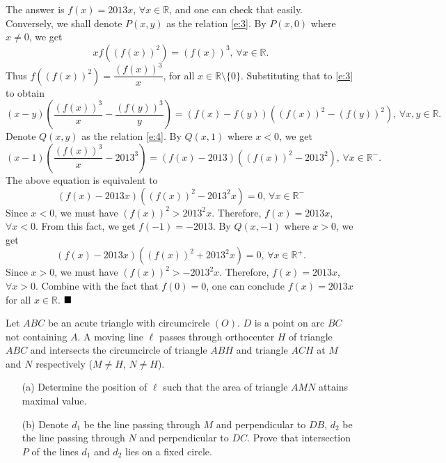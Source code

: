 \documentclass[11pt]{article}
\newenvironment{solution}[1][Solution]{%
  \proof[\normalfont \faPenNib \hspace{0.2cm} \ttfamily \scshape \large #1]%
}{\(\hfill \blacksquare\){\parfillskip0pt\par}}
\theoremstyle{definition}
\begin{document}
        \begin{solution}
            The answer is \(f(x) = 2013x\), \(\forall x \in \mathbb{R}\), and one can check that easily.\\
            Conversely, we shall denote \(P(x,y)\) as the relation \eqref{e:3}. By \(P(x,0)\) where \(x \neq 0\), we get
            \[x f\left(\left(f(x)\right)^2\right) = \left(f(x)\right)^3 \text{, } \forall x \in \mathbb{R}.\]
            Thus \(f\left(\left(f(x)\right)^2\right) = \dfrac{\left(f(x)\right)^3}{x}\), for all \(x \in \mathbb{R} \setminus \{0\}\). Substituting that to \eqref{e:3} to obtain
            \begin{equation}
                (x - y)\left(\frac{\left(f(x)\right)^3}{x} - \frac{\left(f(y)\right)^3}{y}\right) = \left(f(x) - f(y)\right)\left(\left(f(x)\right)^2 - \left(f(y)\right)^2\right) \text{, } \forall x,y \in \mathbb{R}.
                \label{e:4}
            \end{equation}
            Denote \(Q(x,y)\) as the relation \eqref{e:4}. By \(Q(x,1)\) where \(x < 0\), we get
            \[(x - 1)\left(\frac{\left(f(x)\right)^3}{x} - 2013^3\right) = (f(x) - 2013)\left(\left(f(x)\right)^2 - 2013^2\right) \text{, } \forall x \in \mathbb{R}^-.\]
            The above equation is equivalent to
            \[(f(x) - 2013x)\left(\left(f(x)\right)^2 - 2013^2x\right) = 0 \text{, } \forall x \in \mathbb{R}^-\]
            Since \(x < 0\), we must have \((f(x))^2 > 2013^2x\). Therefore, \(f(x) = 2013x\), \(\forall x < 0\). From this fact, we get \(f(-1) = -2013\). By \(Q(x,-1)\) where \(x > 0\), we get
            \[(f(x) - 2013x)\left(\left(f(x)\right)^2 + 2013^2x\right) = 0 \text{, } \forall x \in \mathbb{R}^+.\]
            Since \(x > 0\), we must have \((f(x))^2 > -2013^2x\). Therefore, \(f(x) = 2013x\), \(\forall x > 0\). Combine with the fact that \(f(0) = 0\), one can conclude \(f(x) = 2013x\) for all \(x \in \mathbb{R}\).
        \end{solution}

        \newpage

        \begin{problem}
            Let \(ABC\) be an acute triangle with circumcircle \((O)\). \(D\) is a point on arc \(BC\) not containing \(A\). A moving line \(\ell\) passes through orthocenter \(H\) of triangle \(ABC\) and intersects the circumcircle of triangle \(ABH\) and triangle \(ACH\) at \(M\) and \(N\) respectively (\(M \neq H\), \(N \neq H\)).
            \begin{enumerate}
                \item[(a)] Determine the position of \(\ell\) such that the area of triangle \(AMN\) attains maximal value.
                \item[(b)] Denote \(d_1\) be the line passing through \(M\) and perpendicular to \(DB\), \(d_2\) be the line passing through \(N\) and perpendicular to \(DC\). Prove that intersection \(P\) of the lines \(d_1\) and \(d_2\) lies on a fixed circle.
            \end{enumerate}
        \end{problem}
\end{document}
